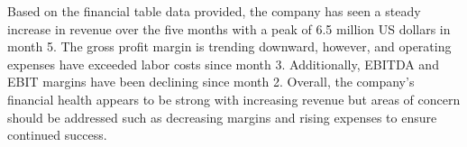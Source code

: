 

Based on the financial table data provided, the company has seen a steady increase in revenue over the five months with a peak of 6.5 million US dollars in month 5. The gross profit margin is trending downward, however, and operating expenses have exceeded labor costs since month 3. Additionally, EBITDA and EBIT margins have been declining since month 2. Overall, the company's financial health appears to be strong with increasing revenue but areas of concern should be addressed such as decreasing margins and rising expenses to ensure continued success.
